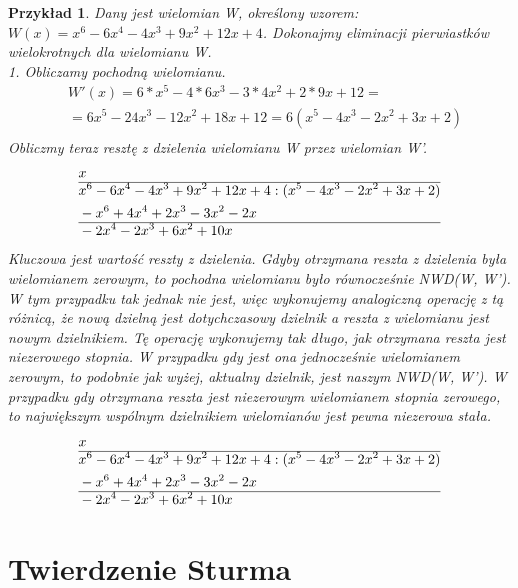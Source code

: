 \documentclass[twoside,a4paper]{book}
\newtheorem{example}{Przykład}
\begin{document}
\begin{example}
	Dany jest wielomian W, określony wzorem: $W(x)=x^6-6x^4-4x^3+9x^2+12x+4$. Dokonajmy eliminacji pierwiastków wielokrotnych dla wielomianu W. \\
	1. Obliczamy pochodną wielomianu.
	\begin{equation}
	\begin{split}
	&W'(x)=6*x^5-4*6x^3-3*4x^2+2*9x+12=\\
	&=6x^5-24x^3-12x^2+18x+12=6(x^5-4x^3-2x^2+3x+2)\\
	\end{split}
	\end{equation}
	Obliczmy teraz resztę z dzielenia wielomianu W przez wielomian W'.
	\begin{equation}
	\begin{split}
	&x\\\hline
	&x^6-6x^4-4x^3+9x^2+12x+4 : (x^5-4x^3-2x^2+3x+2) \\
	&-x^6+4x^4+2x^3-3x^2-2x \\\hline
	&-2x^4-2x^3+6x^2+10x \\
	\end{split}
	\end{equation}
	Kluczowa jest wartość reszty z dzielenia. Gdyby otrzymana reszta z dzielenia była wielomianem zerowym, to pochodna wielomianu było równocześnie NWD(W, W'). W tym przypadku tak jednak nie jest, więc wykonujemy analogiczną operację z tą różnicą, że nową dzielną jest dotychczasowy dzielnik a reszta z wielomianu jest nowym dzielnikiem. Tę operację wykonujemy tak długo, jak otrzymana reszta jest niezerowego stopnia. W przypadku gdy jest ona jednocześnie wielomianem zerowym, to podobnie jak wyżej, aktualny dzielnik, jest naszym NWD(W, W'). W przypadku gdy otrzymana reszta jest niezerowym wielomianem stopnia zerowego, to największym wspólnym dzielnikiem wielomianów jest pewna niezerowa stała.
	\begin{equation}
	\begin{split}
	&x\\\hline
	&x^6-6x^4-4x^3+9x^2+12x+4 : (x^5-4x^3-2x^2+3x+2) \\
	&-x^6+4x^4+2x^3-3x^2-2x \\\hline
	&-2x^4-2x^3+6x^2+10x \\
	\end{split}
	\end{equation}
\end{example}

\section{Twierdzenie Sturma}
\end{document}
